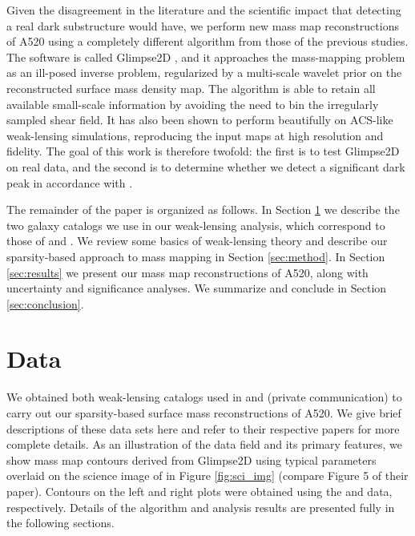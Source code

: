 \documentclass[iop,twocolappendix]{emulateapj}
\newcommand{\cta}[1]{\citetalias{#1}}
\begin{document}
Given the disagreement in the literature and the scientific impact that detecting a real dark 
substructure would have, we perform new mass map reconstructions of A520 using a completely 
different algorithm from those of the previous studies. The software 
is called Glimpse2D \citep{LSL.etal.2016}, and it approaches the mass-mapping problem as an
ill-posed inverse problem, regularized by a multi-scale wavelet prior on the reconstructed
surface mass density map. The algorithm is able to retain all available small-scale information
by avoiding the need to bin the irregularly sampled shear field. It has also been shown to 
perform beautifully on ACS-like weak-lensing simulations, reproducing the input maps at high resolution
and fidelity. The goal of this work is therefore twofold: the first is to test Glimpse2D on real 
data, and the second is to determine whether we detect a significant dark peak in accordance 
with \cta{J14}.

The remainder of the paper is organized as follows. In Section \ref{sec:data} we describe the two 
galaxy catalogs we use in our weak-lensing analysis, which correspond to those of \cta{C12} and \cta{J14}. 
We review some basics of weak-lensing theory and describe our sparsity-based approach to mass mapping in 
Section \ref{sec:method}. In Section \ref{sec:results} we present our mass map reconstructions of A520,
along with uncertainty and significance analyses. 
We summarize and conclude in Section \ref{sec:conclusion}.

\section{Data}\label{sec:data}
We obtained both weak-lensing catalogs used in \cta{C12} and \cta{J14} (private communication) 
to carry out our sparsity-based surface mass reconstructions of A520. We give brief 
descriptions of these data sets here and refer to their respective papers for more complete details.
As an illustration of the data field and its primary features, we show mass map contours
derived from Glimpse2D using typical parameters overlaid on the science image of \cta{J14} 
in Figure \ref{fig:sci_img} (compare Figure 5 of their paper). Contours on the left and right 
plots were obtained using the \cta{C12} and \cta{J14} data, respectively. Details of the algorithm 
and analysis results are presented fully in the following sections.
\end{document}
